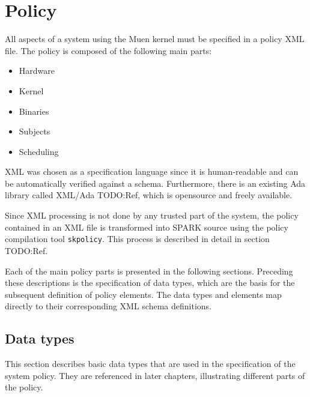 \section{Policy}
All aspects of a system using the Muen kernel must be specified in a policy XML
file. The policy is composed of the following main parts:

\begin{itemize}
	\item Hardware
	\item Kernel
	\item Binaries
	\item Subjects
	\item Scheduling
\end{itemize}

XML was chosen as a specification language since it is human-readable and can
be automatically verified against a schema. Furthermore, there is an existing
Ada library called XML/Ada TODO:Ref, which is opensource and freely available.

Since XML processing is not done by any trusted part of the system, the policy
contained in an XML file is transformed into SPARK source using the policy
compilation tool \texttt{skpolicy}. This process is described in detail in
section TODO:Ref.

Each of the main policy parts is presented in the following sections. Preceding
these descriptions is the specification of data types, which are the basis for
the subsequent definition of policy elements. The data types and elements map
directly to their corresponding XML schema definitions.

\subsection{Data types}
This section describes basic data types that are used in the specification of
the system policy. They are referenced in later chapters, illustrating different
parts of the policy.



